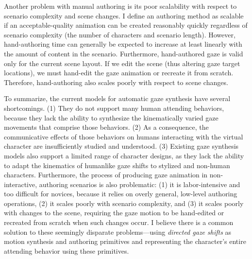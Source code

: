 Another problem with manual authoring is its poor scalability with respect to scenario complexity and scene changes. I define an authoring method as scalable if an acceptable-quality animation can be created reasonably quickly regardless of scenario complexity (the number of characters and scenario length). However, hand-authoring time can generally be expected to increase at least linearly with the amount of content in the scenario. Furthermore, hand-authored gaze is valid only for the current scene layout. If we edit the scene (thus altering gaze target locations), we must hand-edit the gaze animation or recreate it from scratch. Therefore, hand-authoring also scales poorly with respect to scene changes.

To summarize, the current models for automatic gaze synthesis have several shortcomings. (1) They do not support many human attending behaviors, because they lack the ability to synthesize the kinematically varied gaze movements that comprise those behaviors. (2) As a consequence, the communicative effects of those behaviors on humans interacting with the virtual character are insufficiently studied and understood. (3) Existing gaze synthesis models also support a limited range of character designs, as they lack the ability to adapt the kinematics of humanlike gaze shifts to stylized and non-human characters.
Furthermore, the process of producing gaze animation in non-interactive, authoring scenarios is also problematic: (1) it is labor-intensive and too difficult for novices, because it relies on overly general, low-level authoring operations, (2) it scales poorly with scenario complexity, and (3) it scales poorly with changes to the scene, requiring the gaze motion to be hand-edited or recreated from scratch when such changes occur.
I believe there is a common solution to these seemingly disparate problems---using \emph{directed gaze shifts} as motion synthesis and authoring primitives and representing the character's entire attending behavior using these primitives.

